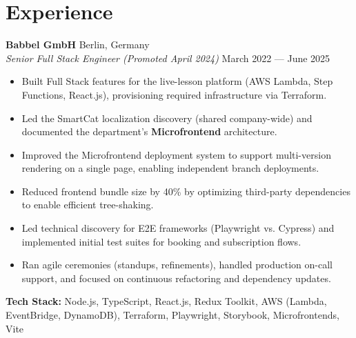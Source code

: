 \documentclass[letterpaper,10pt]{article}
\newcommand{\skills}[1]{\textbf{#1}}
\begin{document}
\section{Experience}

\textbf{Babbel GmbH} \hfill Berlin, Germany \\
\textit{Senior Full Stack Engineer (Promoted April 2024)} \hfill March 2022 --- June 2025
\begin{itemize}[leftmargin=1.5em, label=\textbullet, noitemsep, topsep=2pt]
    \item Built Full Stack features for the live-lesson platform (AWS Lambda, Step Functions, React.js), provisioning required infrastructure via Terraform.
    \item Led the SmartCat localization discovery (shared company-wide) and documented the department's \skills{Microfrontend} architecture.
    \item Improved the Microfrontend deployment system to support multi-version rendering on a single page, enabling independent branch deployments.
    \item Reduced frontend bundle size by 40\% by optimizing third-party dependencies to enable efficient tree-shaking.
    \item Led technical discovery for E2E frameworks (Playwright vs. Cypress) and implemented initial test suites for booking and subscription flows.
    \item Ran agile ceremonies (standups, refinements), handled production on-call support, and focused on continuous refactoring and dependency updates.
\end{itemize}
\textbf{Tech Stack:} Node.js, TypeScript, React.js, Redux Toolkit, AWS (Lambda, EventBridge, DynamoDB), Terraform, Playwright, Storybook, Microfrontends, Vite

\medskip
\end{document}
